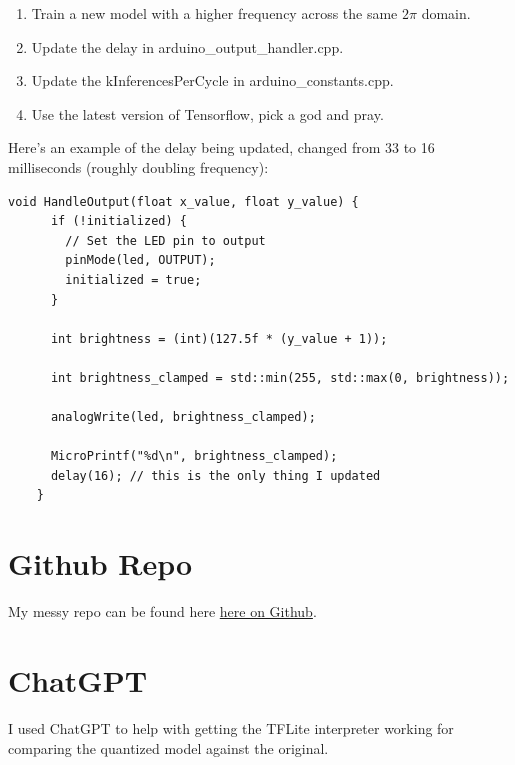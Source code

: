 \documentclass{article}
\begin{document}
    \begin{enumerate}
        \item Train a new model with a higher frequency across the same $2\pi$ domain.
        \item Update the delay in arduino\_output\_handler.cpp.
        \item Update the kInferencesPerCycle in arduino\_constants.cpp.
        \item Use the latest version of Tensorflow, pick a god and pray.
    \end{enumerate}

    Here's an example of the delay being updated, changed from 33 to 16 milliseconds (roughly doubling frequency):

    \begin{lstlisting}[label={lst:delay}]
    void HandleOutput(float x_value, float y_value) {
      if (!initialized) {
        // Set the LED pin to output
        pinMode(led, OUTPUT);
        initialized = true;
      }

      int brightness = (int)(127.5f * (y_value + 1));

      int brightness_clamped = std::min(255, std::max(0, brightness));

      analogWrite(led, brightness_clamped);

      MicroPrintf("%d\n", brightness_clamped);
      delay(16); // this is the only thing I updated
    }
    \end{lstlisting}

    \section{Github Repo}\label{sec:deliverables}
    My messy repo can be found here \href{https://github.com/crimsonmagick/cosc592\_arduino1.git}{here on Github}.

    \section{ChatGPT}\label{sec:chatgpt}

    I used ChatGPT to help with getting the TFLite interpreter working for comparing the quantized model against the original.

    
    
\end{document}
